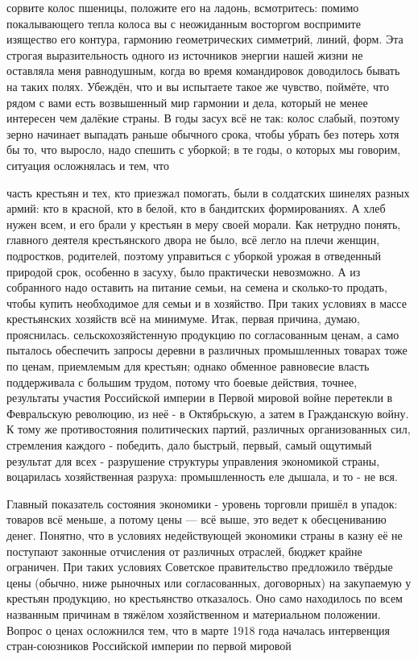 \label{079-1}
сорвите колос пшеницы, положите его на ладонь, всмотритесь: помимо покалывающего тепла колоса вы с неожиданным восторгом воспримите изящество его контура, гармонию геометрических симметрий, линий, форм. Эта строгая выразительность одного из источников энергии нашей жизни не оставляла меня равнодушным, когда во время командировок доводилось бывать на таких полях. Убеждён, что и вы испытаете такое же чувство, поймёте, что рядом с вами есть возвышенный мир гармонии и дела, который не менее интересен чем 
далёкие страны. В годы засух всё не так: колос слабый, поэтому зерно начинает выпадать раньше обычного срока, чтобы убрать без потерь хотя бы то, что выросло, надо спешить с уборкой; в те годы, о которых мы говорим, ситуация осложнялась и тем, что

\label{080-1}
часть крестьян и тех, кто приезжал помогать, были в солдатских шинелях разных армий: кто в красной, кто в белой, кто в бандитских формированиях. А хлеб нужен всем, и его брали у крестьян в меру своей морали. Как нетрудно понять, главного деятеля крестьянского двора не было, всё легло на плечи женщин, подростков, родителей, поэтому управиться с уборкой урожая в отведенный природой срок, особенно в засуху, было практически невозможно. А из собранного надо оставить на питание семьи, на семена и сколько-то продать, чтобы купить необходимое для семьи и в хозяйство. При таких условиях в массе крестьянских хозяйств всё на минимуме. Итак, первая причина, думаю, прояснилась.
\label{081-1}
сельскохозяйстенную продукцию по согласованным ценам, а само пыталось обеспечить запросы деревни в различных промышленных товарах тоже по ценам, приемлемым для крестьян; однако обменное равновесие власть поддерживала с большим трудом, потому что боевые действия, точнее, результаты участия Российской империи в Первой мировой войне перетекли в Февральскую революцию, из неё - в Октябрьскую, а затем в Гражданскую войну. К тому же противостояния политических партий, различных организованных сил, стремления каждого - победить, дало быстрый, первый, самый ощутимый результат для всех - разрушение структуры управления экономикой страны, воцарилась хозяйственная разруха: промышленность еле дышала, и то - не вся.

\label{082-1}
Главный показатель состояния экономики - уровень торговли пришёл в упадок: товаров всё меньше, а потому цены — всё выше, это ведет к обесцениванию  денег. Понятно, что в условиях недействующей экономики страны в казну её не поступают законные отчисления от различных отраслей, бюджет крайне ограничен. При таких условиях Советское правительство предложило твёрдые цены (обычно, ниже рыночных или согласованных, договорных) на закупаемую у крестьян продукцию, но крестьянство отказалось. Оно само находилось по всем названным причинам в тяжёлом хозяйственном и материальном положении. Вопрос о ценах осложнился тем, что в марте 1918 года началась интервенция стран-союзников Российской империи по первой мировой 

